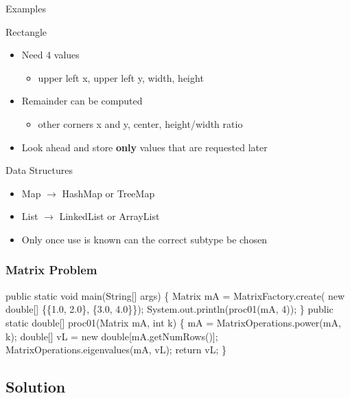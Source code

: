 \documentclass{beamer}
\begin{document}
\begin{frame}{Examples}
  \begin{block}{Rectangle}
    \begin{itemize}
    \item Need 4 values
      \begin{itemize}
      \item upper left x, upper left y, width, height
      \end{itemize}
    \item Remainder can be computed
      \begin{itemize}
      \item other corners x and y, center, height/width ratio
      \end{itemize}
\pause
    \item Look ahead and store {\bf only} values that are requested later
    \end{itemize}
  \end{block}
\pause
  \begin{block}{Data Structures}
    \begin{itemize}
    \item Map $\rightarrow$ HashMap or TreeMap
    \item List $\rightarrow$ LinkedList or ArrayList
    \item Only once use is known can the correct subtype be chosen
    \end{itemize}
  \end{block}
\end{frame}

\begin{frame}[fragile]
  \frametitle{Matrix Problem}
  \begin{semiverbatim}
  public static void main(String[] args) \{
    Matrix mA = MatrixFactory.create(
        new double[] \{\{1.0, 2.0\}, \{3.0, 4.0\}\});
    System.out.println(proc01(mA, 4));
  \}
  public static double[] proc01(Matrix mA, int k) \{
    mA = MatrixOperations.power(mA, k);
    double[] vL = new double[mA.getNumRows()];
    MatrixOperations.eigenvalues(mA, vL);
    return vL;
  \}
  \end{semiverbatim}
\end{frame}

\subsection{Solution}
\end{document}
